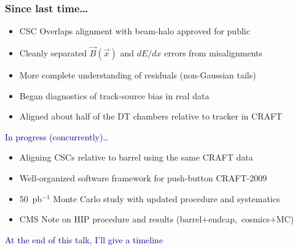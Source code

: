 \documentclass[compress]{beamer}
\begin{document}
\begin{frame}
\frametitle{Since last time\ldots}

\begin{itemize}
\item CSC Overlaps alignment with beam-halo approved for public
\item Cleanly separated $\vec{B}(\vec{x})$ and $dE/dx$ errors from misalignments
\item More complete understanding of residuals (non-Gaussian tails)
\item Began diagnostics of track-source bias in real data
\item Aligned about half of the DT chambers relative to tracker in CRAFT
\end{itemize}

\vfill
\hspace{-0.83 cm} \textcolor{darkblue}{\Large In progress {\large (concurrently)}\ldots}

\begin{itemize}
\item Aligning CSCs relative to barrel using the same CRAFT data
\item Well-organized software framework for push-button CRAFT-2009
\item 50~pb$^{-1}$ Monte Carlo study with updated procedure and systematics
\item CMS Note on HIP procedure and results \mbox{(barrel$+$endcap, cosmics$+$MC)\hspace{-1 cm}}
\end{itemize}

\vfill
\hspace{-0.83 cm} \textcolor{darkblue}{\large At the end of this talk, I'll give a timeline}
\end{frame}
\end{document}
